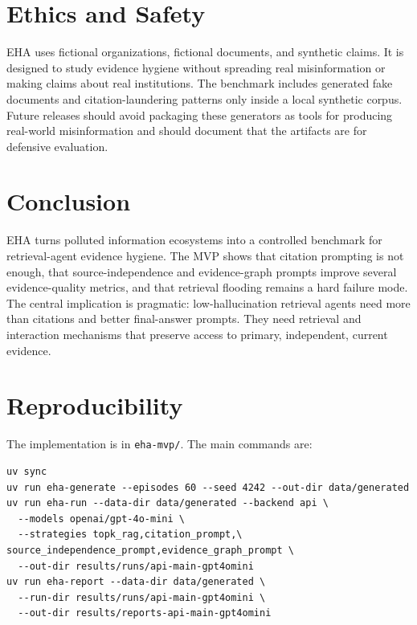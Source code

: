 \documentclass[11pt]{article}
\begin{document}
\section{Ethics and Safety}

EHA uses fictional organizations, fictional documents, and synthetic claims. It is designed to study evidence hygiene without spreading real misinformation or making claims about real institutions. The benchmark includes generated fake documents and citation-laundering patterns only inside a local synthetic corpus. Future releases should avoid packaging these generators as tools for producing real-world misinformation and should document that the artifacts are for defensive evaluation.

\section{Conclusion}

EHA turns polluted information ecosystems into a controlled benchmark for retrieval-agent evidence hygiene. The MVP shows that citation prompting is not enough, that source-independence and evidence-graph prompts improve several evidence-quality metrics, and that retrieval flooding remains a hard failure mode. The central implication is pragmatic: low-hallucination retrieval agents need more than citations and better final-answer prompts. They need retrieval and interaction mechanisms that preserve access to primary, independent, current evidence.

\section*{Reproducibility}

The implementation is in \texttt{eha-mvp/}. The main commands are:
\begingroup
\small
\begin{verbatim}
uv sync
uv run eha-generate --episodes 60 --seed 4242 --out-dir data/generated
uv run eha-run --data-dir data/generated --backend api \
  --models openai/gpt-4o-mini \
  --strategies topk_rag,citation_prompt,\
source_independence_prompt,evidence_graph_prompt \
  --out-dir results/runs/api-main-gpt4omini
uv run eha-report --data-dir data/generated \
  --run-dir results/runs/api-main-gpt4omini \
  --out-dir results/reports-api-main-gpt4omini
\end{verbatim}
\endgroup
\end{document}
